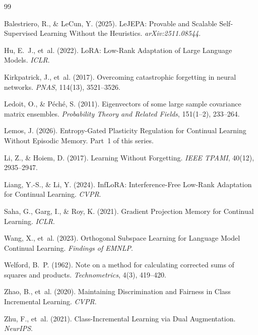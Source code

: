 \documentclass[11pt,a4paper]{article}
\begin{document}


\begin{thebibliography}{99}

Balestriero, R., \& LeCun, Y. (2025).
\newblock LeJEPA: Provable and Scalable Self-Supervised Learning Without the Heuristics.
\newblock \emph{arXiv:2511.08544}.

Hu, E.~J., et~al. (2022).
\newblock LoRA: Low-Rank Adaptation of Large Language Models.
\newblock \emph{ICLR}.

Kirkpatrick, J., et~al. (2017).
\newblock Overcoming catastrophic forgetting in neural networks.
\newblock \emph{PNAS}, 114(13), 3521--3526.

Ledoit, O., \& P\'{e}ch\'{e}, S. (2011).
\newblock Eigenvectors of some large sample covariance matrix ensembles.
\newblock \emph{Probability Theory and Related Fields}, 151(1--2), 233--264.

Lemos, J. (2026).
\newblock Entropy-Gated Plasticity Regulation for Continual Learning Without Episodic Memory.
\newblock Part~1 of this series.

Li, Z., \& Hoiem, D. (2017).
\newblock Learning Without Forgetting.
\newblock \emph{IEEE TPAMI}, 40(12), 2935--2947.

Liang, Y.-S., \& Li, Y. (2024).
\newblock InfLoRA: Interference-Free Low-Rank Adaptation for Continual Learning.
\newblock \emph{CVPR}.

Saha, G., Garg, I., \& Roy, K. (2021).
\newblock Gradient Projection Memory for Continual Learning.
\newblock \emph{ICLR}.

Wang, X., et~al. (2023).
\newblock Orthogonal Subspace Learning for Language Model Continual Learning.
\newblock \emph{Findings of EMNLP}.

Welford, B.~P. (1962).
\newblock Note on a method for calculating corrected sums of squares and products.
\newblock \emph{Technometrics}, 4(3), 419--420.

Zhao, B., et~al. (2020).
\newblock Maintaining Discrimination and Fairness in Class Incremental Learning.
\newblock \emph{CVPR}.

Zhu, F., et~al. (2021).
\newblock Class-Incremental Learning via Dual Augmentation.
\newblock \emph{NeurIPS}.

\end{thebibliography}
\end{document}
